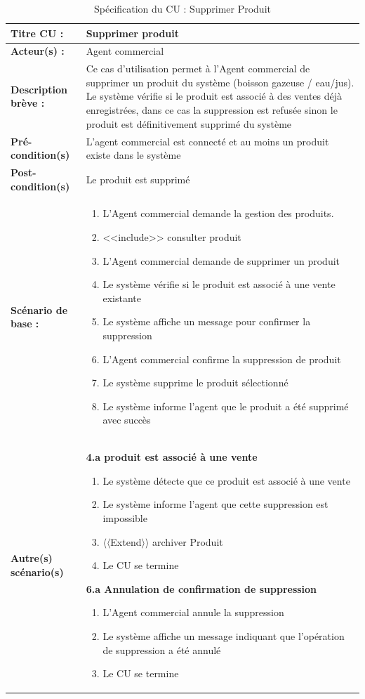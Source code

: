 \begin{table}[H]
\begin{tabularx}{\textwidth}{|l|X|}
\hline
\textbf{Titre CU :} & Supprimer produit \\
\hline
\textbf{Acteur(s) :} & Agent commercial \\
\hline
\textbf{Description brève :} & Ce cas d'utilisation permet à l'Agent commercial de supprimer un produit du système (boisson gazeuse / eau/jus). Le système vérifie si le produit est associé à des ventes déjà enregistrées, dans ce cas la suppression est refusée sinon le produit est définitivement supprimé du système \\
\hline
\textbf{Pré-condition(s)} & L'agent commercial est connecté et au moins un produit existe dans le système \\
\hline
\textbf{Post-condition(s)} & Le produit est supprimé \\
\hline
\textbf{Scénario de base :} &
\begin{enumerate}[leftmargin=1.5em, topsep=2pt, itemsep=1pt]
  \item L'Agent commercial demande la gestion des produits.
  \item <<include>> consulter produit
  \item L'Agent commercial demande de supprimer un produit
  \item Le système vérifie si le produit est associé à une vente existante
  \item Le système affiche un message pour confirmer la suppression
  \item L'Agent commercial confirme la suppression de produit
  \item Le système supprime le produit sélectionné
  \item Le système informe l'agent que le produit a été supprimé avec succès
\end{enumerate} \\
\hline
\textbf{Autre(s) scénario(s)} &
\textbf{4.a produit est associé à une vente}
\begin{enumerate}[leftmargin=1.5em, topsep=2pt, itemsep=1pt]
  \item Le système détecte que ce produit est associé à une vente
  \item Le système informe l'agent que cette suppression est impossible
  \item $\langle\langle$Extend$\rangle\rangle$ archiver Produit
  \item Le CU se termine
\end{enumerate}
\textbf{6.a Annulation de confirmation de suppression}
\begin{enumerate}[leftmargin=1.5em, topsep=2pt, itemsep=1pt]
  \item L'Agent commercial annule la suppression
  \item Le système affiche un message indiquant que l'opération de suppression a été annulé
  \item Le CU se termine
\end{enumerate} \\
\hline
\end{tabularx}
\caption{Spécification du CU : Supprimer Produit}
\label{tab:cu-supprimer-produit}
\end{table}

